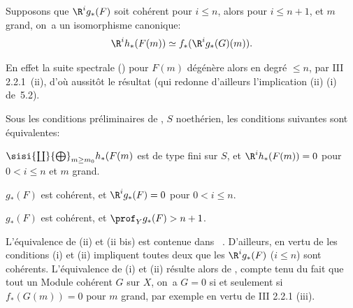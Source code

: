 \begin{corollaire} \label{XII.5.4}
Supposons que $\R^ig_\ast(F)$ soit coh\'erent pour $i\leq n$, alors pour $i\leq n+1$, et $m$ grand, on~a un isomorphisme canonique:
\[
\R^ih_\ast(F(m)) \simeq f_\ast(\R^ig_\ast(G)(m)).
\]
\end{corollaire}

En effet la suite spectrale () pour $F(m)$ d\'eg\'en\`ere alors en degr\'e $\leq n$, par \EGA III 2.2.1~(ii), d'o\`u aussit\^{o}t le r\'esultat (qui redonne d'ailleurs l'implication (ii) \ALORS (i) de~5.2).

\enlargethispage{1.2\baselineskip}%
\begin{corollaire} \label{XII.5.5}
Sous les conditions pr\'eliminaires de , $S$ noeth\'erien, les conditions suivantes sont \'equivalentes:
\begin{enumeratei}
\item
$\sisi{\coprod}{\bigoplus}_{m\geq m_0}h_\ast(F(m)$ est de type fini sur $S$, et $\R^ih_\ast(F(m))=0$ pour $0<i\leq n$ et $m$ grand.
\item
$g_\ast(F)$ est coh\'erent, et $\R^ig_\ast(F)=0$ pour $0<i\leq n$.
\item[\textup{(ii bis)}] $g_\ast(F)$ est coh\'erent, et $\prof_Y g_\ast(F)>n+1$.
\end{enumeratei}
\end{corollaire}

L'\'equivalence de (ii) et (ii bis) est contenue dans ~. D'ailleurs, en vertu de  les conditions (i) et (ii) impliquent toutes deux que les $\R^ig_\ast(F)$ ($i\leq n$) sont coh\'erents. L'\'equivalence de (i) et (ii) r\'esulte alors de , compte tenu du fait que tout un Module coh\'erent $G$ sur $X$, on~a $G=0$ si et seulement si $f_\ast(G(m))=0$ pour $m$ grand, par exemple en vertu de \EGA III 2.2.1 (iii).

